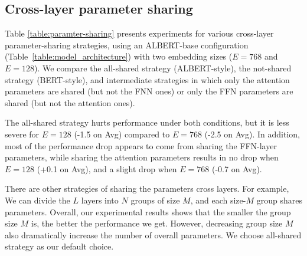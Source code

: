 
\vspace{-3pt}

\subsection{Cross-layer parameter sharing}
\label{sec:sharing}
Table \ref{table:paramter-sharing} presents experiments for various cross-layer parameter-sharing strategies, using an ALBERT-base configuration (Table~\ref{table:model_architecture}) with two embedding sizes ($E=768$ and $E=128$).
We compare the all-shared strategy (ALBERT-style), the not-shared strategy (BERT-style), and intermediate strategies in which only the attention parameters are shared (but not the FNN ones) or only the FFN parameters are shared (but not the attention ones).

The all-shared strategy hurts performance under both conditions, but it is less severe for $E=128$ (-1.5 on Avg) compared to $E=768$ (-2.5 on Avg).
In addition, most of the performance drop appears to come from sharing the FFN-layer parameters, while sharing the attention parameters results in no drop when $E=128$ (+0.1 on Avg), and a slight drop when $E=768$ (-0.7 on Avg).

There are other strategies of sharing the parameters cross layers. For example, We can divide the $L$ layers into $N$ groups of size $M$, and each size-$M$ group shares parameters. Overall, our experimental results shows that the smaller the group size $M$ is, the better the performance we get. However, decreasing group size $M$ also dramatically increase the number of overall parameters. We choose all-shared strategy as our default choice.  

